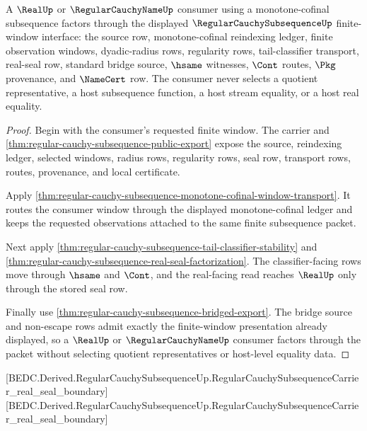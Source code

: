 \begin{theorem}
\label{thm:regular-cauchy-subsequence-mature-consumer-example}
A $\RealUp$ or $\RegularCauchyNameUp$ consumer using a monotone-cofinal subsequence factors through the displayed $\RegularCauchySubsequenceUp$ finite-window interface: the source row, monotone-cofinal reindexing ledger, finite observation windows, dyadic-radius rows, regularity rows, tail-classifier transport, real-seal row, standard bridge source, $\hsame$ witnesses, $\Cont$ routes, $\Pkg$ provenance, and $\NameCert$ row. The consumer never selects a quotient representative, a host subsequence function, a host stream equality, or a host real equality.
\end{theorem}
\begin{proof}
Begin with the consumer's requested finite window. The carrier and \autoref{thm:regular-cauchy-subsequence-public-export} expose the source, reindexing ledger, selected windows, radius rows, regularity rows, seal row, transport rows, routes, provenance, and local certificate.

Apply \autoref{thm:regular-cauchy-subsequence-monotone-cofinal-window-transport}. It routes the consumer window through the displayed monotone-cofinal ledger and keeps the requested observations attached to the same finite subsequence packet.

Next apply \autoref{thm:regular-cauchy-subsequence-tail-classifier-stability} and \autoref{thm:regular-cauchy-subsequence-real-seal-factorization}. The classifier-facing rows move through $\hsame$ and $\Cont$, and the real-facing read reaches $\RealUp$ only through the stored seal row.

Finally use \autoref{thm:regular-cauchy-subsequence-bridged-export}. The bridge source and non-escape rows admit exactly the finite-window presentation already displayed, so a $\RealUp$ or $\RegularCauchyNameUp$ consumer factors through the packet without selecting quotient representatives or host-level equality data.
\end{proof}

[BEDC.Derived.RegularCauchySubsequenceUp.RegularCauchySubsequenceCarrier\_real\_seal\_boundary]
[BEDC.Derived.RegularCauchySubsequenceUp.RegularCauchySubsequenceCarrier\_real\_seal\_boundary]

